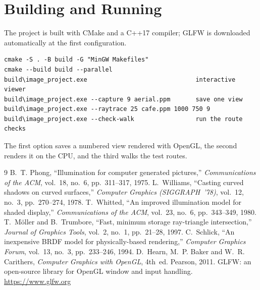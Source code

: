 \documentclass[11pt,a4paper]{article}
\begin{document}
\section{Building and Running}
The project is built with CMake and a C++17 compiler; GLFW is downloaded
automatically at the first configuration.
\begin{verbatim}
cmake -S . -B build -G "MinGW Makefiles"
cmake --build build --parallel
build\image_project.exe                              interactive viewer
build\image_project.exe --capture 9 aerial.ppm       save one view
build\image_project.exe --raytrace 25 cafe.ppm 1000 750 9
build\image_project.exe --check-walk                 run the route checks
\end{verbatim}
The first option saves a numbered view rendered with OpenGL, the second
renders it on the CPU, and the third walks the test routes.

\begin{thebibliography}{9}\small
{} B.~T. Phong, ``Illumination for computer generated pictures,'' \emph{Communications of the ACM}, vol.~18, no.~6, pp.~311--317, 1975.
 L.~Williams, ``Casting curved shadows on curved surfaces,'' \emph{Computer Graphics (SIGGRAPH~'78)}, vol.~12, no.~3, pp.~270--274, 1978.
 T.~Whitted, ``An improved illumination model for shaded display,'' \emph{Communications of the ACM}, vol.~23, no.~6, pp.~343--349, 1980.
 T.~M\"oller and B.~Trumbore, ``Fast, minimum storage ray-triangle intersection,'' \emph{Journal of Graphics Tools}, vol.~2, no.~1, pp.~21--28, 1997.
 C.~Schlick, ``An inexpensive BRDF model for physically-based rendering,'' \emph{Computer Graphics Forum}, vol.~13, no.~3, pp.~233--246, 1994.
 D.~Hearn, M.~P. Baker and W.~R. Carithers, \emph{Computer Graphics with OpenGL}, 4th~ed. Pearson, 2011.
 GLFW: an open-source library for OpenGL window and input handling. \url{https://www.glfw.org}
\end{thebibliography}
\end{document}
